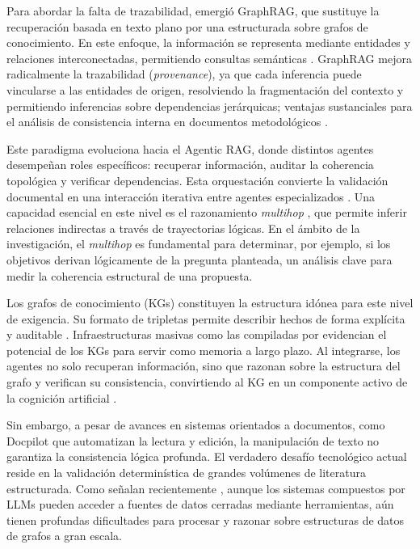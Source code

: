 \documentclass[12pt,letterpaper]{article}
\begin{document}
Para abordar la falta de trazabilidad, emergió GraphRAG, que sustituye la recuperación basada en texto plano por una estructurada sobre grafos de conocimiento. En este enfoque, la información se representa mediante entidades y relaciones interconectadas, permitiendo consultas semánticas \citep{Edge2025}. GraphRAG mejora radicalmente la trazabilidad (\textit{provenance}), ya que cada inferencia puede vincularse a las entidades de origen, resolviendo la fragmentación del contexto y permitiendo inferencias sobre dependencias jerárquicas; ventajas sustanciales para el análisis de consistencia interna en documentos metodológicos \citep{Colombo2024}.

Este paradigma evoluciona hacia el Agentic RAG, donde distintos agentes desempeñan roles específicos: recuperar información, auditar la coherencia topológica y verificar dependencias. Esta orquestación convierte la validación documental en una interacción iterativa entre agentes especializados \citep{Acharya2025}. Una capacidad esencial en este nivel es el razonamiento \textit{multihop} \citep{Ren2022}, que permite inferir relaciones indirectas a través de trayectorias lógicas. En el ámbito de la investigación, el \textit{multihop} es fundamental para determinar, por ejemplo, si los objetivos derivan lógicamente de la pregunta planteada, un análisis clave para medir la coherencia estructural de una propuesta.

Los grafos de conocimiento (KGs) constituyen la estructura idónea para este nivel de exigencia. Su formato de tripletas permite describir hechos de forma explícita y auditable \citep{Sardina2024}. Infraestructuras masivas como las compiladas por \cite{Dess2025} evidencian el potencial de los KGs para servir como memoria a largo plazo. Al integrarse, los agentes no solo recuperan información, sino que razonan sobre la estructura del grafo y verifican su consistencia, convirtiendo al KG en un componente activo de la cognición artificial \citep{Colombo2024}.

Sin embargo, a pesar de avances en sistemas orientados a documentos, como Docpilot \citep{Mathur2024} que automatizan la lectura y edición, la manipulación de texto no garantiza la consistencia lógica profunda. El verdadero desafío tecnológico actual reside en la validación determinística de grandes volúmenes de literatura estructurada. Como señalan recientemente \cite{Shi2025}, aunque los sistemas compuestos por LLMs pueden acceder a fuentes de datos cerradas mediante herramientas, aún tienen profundas dificultades para procesar y razonar sobre estructuras de datos de grafos a gran escala. 
\end{document}
